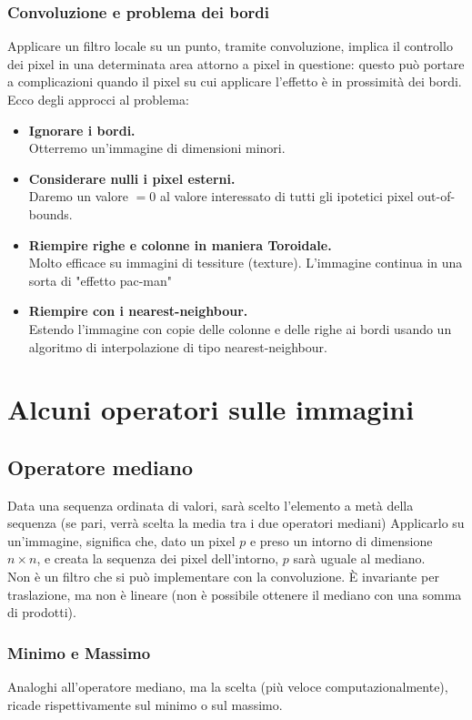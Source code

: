 \documentclass{report}
\begin{document}
	\subsection{Convoluzione e problema dei bordi}
	Applicare un filtro locale su un punto, tramite convoluzione, implica il controllo dei pixel in una determinata area attorno a pixel in questione: questo può portare a complicazioni quando il pixel su cui applicare l'effetto è in prossimità dei bordi. Ecco degli approcci al problema:
	\begin{itemize}
		\item \textbf{Ignorare i bordi.}\\
		      Otterremo un'immagine di dimensioni minori.
		\item \textbf{Considerare nulli i pixel esterni.}\\
		      Daremo un valore $=0$ al valore interessato di tutti gli ipotetici pixel out-of-bounds.
		\item \textbf{Riempire righe e colonne in maniera Toroidale.}\\
		      Molto efficace su immagini di tessiture (texture). L'immagine continua in una sorta di "effetto pac-man"
		\item \textbf{Riempire con i nearest-neighbour.}\\
		      Estendo l'immagine con copie delle colonne e delle righe ai bordi usando un algoritmo di interpolazione di tipo nearest-neighbour.
	\end{itemize}
	\chapter{Alcuni operatori sulle immagini}
	\section{Operatore mediano}
	Data una sequenza ordinata di valori, sarà scelto l'elemento a metà della sequenza (se pari, verrà scelta la media tra i due operatori mediani)
	Applicarlo su un'immagine, significa che, dato un pixel $p$ e preso un intorno di dimensione $n\times n$, e creata la sequenza dei pixel dell'intorno, $p$ sarà uguale al mediano.\\
	Non è un filtro che si può implementare con la convoluzione. È invariante per traslazione, ma non è lineare (non è possibile ottenere il mediano con una somma di prodotti).
	\subsection{Minimo e Massimo}
	Analoghi all'operatore mediano, ma la scelta (più veloce computazionalmente), ricade rispettivamente sul minimo o sul massimo.
		
\end{document}
